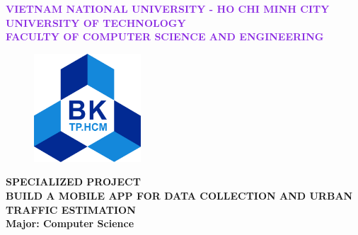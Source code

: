 \documentclass[a4paper]{article}
\begin{document}

\begin{titlepage}
\begin{center}
\large\textcolor{BlueViolet}{\textbf{
VIETNAM NATIONAL UNIVERSITY - HO CHI MINH CITY \\
UNIVERSITY OF TECHNOLOGY \\
FACULTY OF COMPUTER SCIENCE AND ENGINEERING}}
\vspace{1cm}

\begin{figure}[ht]
    \centering
    \includegraphics[width=4cm]{assets/images/Trivia/hcmut.png}
\end{figure}

\begin{center}
\textbf{{\Large SPECIALIZED PROJECT}}\\
\vspace{1cm}
{\fontsize{36}{20}\selectfont %
\textbf{{BUILD A MOBILE APP FOR DATA COLLECTION AND URBAN TRAFFIC ESTIMATION}}\\
}
\vspace{1cm}
\textbf{{\Large Major: Computer Science}}
\end{center}

\vspace{1cm}


\end{center}
\end{titlepage}
\end{document}
